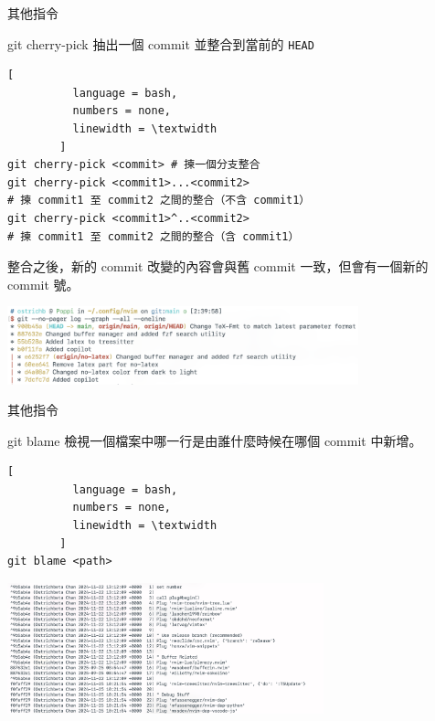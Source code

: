 \documentclass[xetex, unicode, 10pt, aspectratio=169]{beamer}
\begin{document}
\begin{frame}[fragile]{其他指令}
    \begin{block}{git cherry-pick}
        抽出一個 commit 並整合到當前的 \texttt{HEAD}
        \begin{lstlisting}[
          language = bash,
          numbers = none,
          linewidth = \textwidth
        ]
git cherry-pick <commit> # 揀一個分支整合
git cherry-pick <commit1>...<commit2>
# 揀 commit1 至 commit2 之間的整合（不含 commit1）
git cherry-pick <commit1>^..<commit2>
# 揀 commit1 至 commit2 之間的整合（含 commit1）\end{lstlisting}
        \pause
        整合之後，新的 commit 改變的內容會與舊 commit 一致，但會有一個新的 commit 號。
        \begin{center}
            \includegraphics[width=4in]{./img/git-log-cherrypick.png}
        \end{center}
    \end{block}
\end{frame}

\begin{frame}[fragile]{其他指令}
    \begin{block}{git blame}
        檢視一個檔案中哪一行是由誰什麼時候在哪個 commit 中新增。
        \begin{lstlisting}[
          language = bash,
          numbers = none,
          linewidth = \textwidth
        ]
git blame <path>\end{lstlisting}

        \begin{center}
            \includegraphics[width=3.6in]{./img/git-blame.png}
        \end{center}
    \end{block}
\end{frame}
\end{document}
